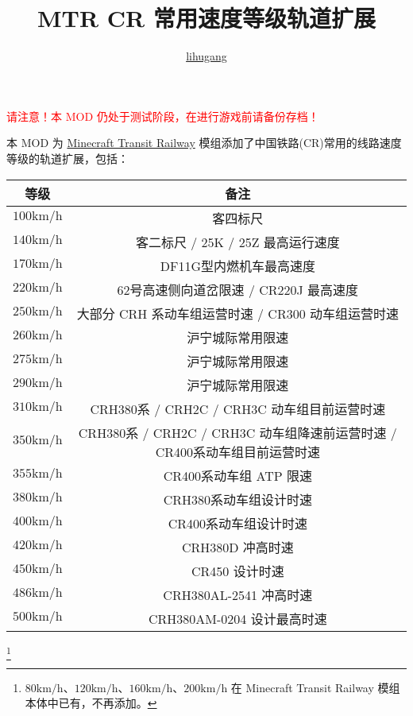 \documentclass{article}
\title{MTR CR 常用速度等级轨道扩展}
\author{\href{https://github.com/lihugang/mtr-cr-speed-rails}{lihugang}}
\begin{document}
\maketitle

\textcolor{red}{请注意！本 MOD 仍处于测试阶段，在进行游戏前请备份存档！}

本 MOD 为 \href{https://minecrafttransitrailway.com/}{Minecraft Transit Railway} 模组添加了中国铁路(CR)常用的线路速度等级的轨道扩展，包括：

\begin{table}[!ht]
    \centering
    \begin{tabular}{|c|c|}
    \hline
        等级 & 备注 \\ \hline
        $100 \textrm{km/h}$ & 客四标尺 \\ \hline
        $140 \textrm{km/h}$ & 客二标尺 / 25K / 25Z 最高运行速度 \\ \hline
        $170 \textrm{km/h}$ & DF11G型内燃机车最高速度 \\ \hline
        $220 \textrm{km/h}$ & 62号高速侧向道岔限速 / CR220J 最高速度 \\ \hline
        $250 \textrm{km/h}$ & 大部分 CRH 系动车组运营时速 / CR300 动车组运营时速 \\ \hline
        $260 \textrm{km/h}$ & 沪宁城际常用限速 \\ \hline
        $275 \textrm{km/h}$ & 沪宁城际常用限速 \\ \hline
        $290 \textrm{km/h}$ & 沪宁城际常用限速 \\ \hline
        $310 \textrm{km/h}$ & CRH380系 / CRH2C / CRH3C 动车组目前运营时速 \\ \hline
        $350 \textrm{km/h}$ & CRH380系 / CRH2C / CRH3C 动车组降速前运营时速 / CR400系动车组目前运营时速 \\ \hline
        $355 \textrm{km/h}$ & CR400系动车组 ATP 限速 \\ \hline
        $380 \textrm{km/h}$ & CRH380系动车组设计时速 \\ \hline
        $400 \textrm{km/h}$ & CR400系动车组设计时速 \\ \hline
        $420 \textrm{km/h}$ & CRH380D 冲高时速 \\ \hline
        $450 \textrm{km/h}$ & CR450 设计时速 \\ \hline
        $486 \textrm{km/h}$ & CRH380AL-2541 冲高时速 \\ \hline
        $500 \textrm{km/h}$ & CRH380AM-0204 设计最高时速 \\ \hline
    \end{tabular}
\end{table}
\footnote{$80\textrm{km/h}$、$120\textrm{km/h}$、$160\textrm{km/h}$、$200\textrm{km/h}$ 在 Minecraft Transit Railway 模组本体中已有，不再添加。}
\end{document}
